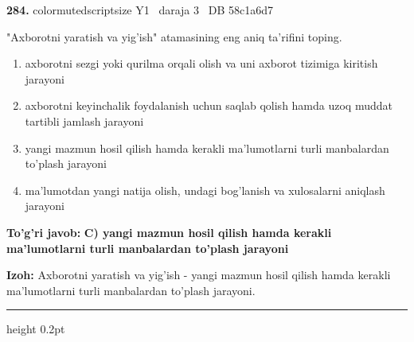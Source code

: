 \documentclass[10pt,a4paper,oneside]{article}
\begin{document}
\noindent\textbf{\color{ink}284.}  {color{muted}scriptsize Y1 \textbullet\ daraja 3 \textbullet\ DB 58c1a6d7}
\par
"Axborotni yaratish va yig'ish" atamasining eng aniq ta'rifini toping.
\begin{enumerate}[label=\Alph*),leftmargin=9mm]
\item axborotni sezgi yoki qurilma orqali olish va uni axborot tizimiga kiritish jarayoni
\item axborotni keyinchalik foydalanish uchun saqlab qolish hamda uzoq muddat tartibli jamlash jarayoni
\item yangi mazmun hosil qilish hamda kerakli ma'lumotlarni turli manbalardan to'plash jarayoni
\item ma'lumotdan yangi natija olish, undagi bog'lanish va xulosalarni aniqlash jarayoni
\end{enumerate}
\begin{tcolorbox}[enhanced,breakable,colback=teal!4,colframe=teal!50!black,boxrule=0.5pt,arc=1.1mm,left=3mm,right=3mm,top=1.7mm,bottom=1.7mm,before skip=2mm,after skip=2mm]
\textbf{\color{teal}To'g'ri javob:} \textbf{C) yangi mazmun hosil qilish hamda kerakli ma'lumotlarni turli manbalardan to'plash jarayoni}
\par\smallskip
\textbf{Izoh:} Axborotni yaratish va yig'ish - yangi mazmun hosil qilish hamda kerakli ma'lumotlarni turli manbalardan to'plash jarayoni.
\end{tcolorbox}
\vspace{2mm}\hrule height 0.2pt \vspace{3mm}
\end{document}

